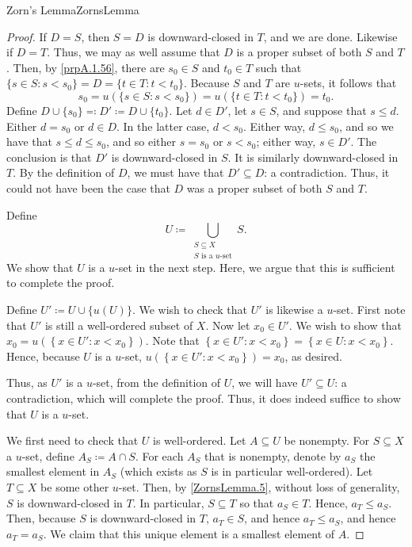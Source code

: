 \begin{thm}{Zorn's Lemma}{ZornsLemma}
\begin{proof}
If $D=S$, then $S=D$ is downward-closed in $T$, and we are done.  Likewise if $D=T$.  Thus, we may as well assume that $D$ is a proper subset of both $S$ and $T$.  Then, by \cref{prpA.1.56}, there are $s_0\in S$ and $t_0\in T$ such that $\{ s\in S:s<s_0\} =D=\{ t\in T:t<t_0\}$.  Because $S$ and $T$ are $u$-sets, it follows that
\begin{equation}
s_0=u\left( \{ s\in S:s<s_0\} \right) =u\left( \{ t\in T:t<t_0\} \right) =t_0.
\end{equation}
Define $D\cup \{ s_0\} \eqqcolon D'\coloneqq D\cup \{ t_0\}$.
Let $d\in D'$, let $s\in S$, and suppose that $s\leq d$.  Either $d=s_0$ or $d\in D$.  In the latter case, $d<s_0$.  Either way, $d\leq s_0$, and so we have that $s\leq d\leq s_0$, and so either $s=s_0$ or $s<s_0$; either way, $s\in D'$.  The conclusion is that $D'$ is downward-closed in $S$.  It is similarly downward-closed in $T$.  By the definition of $D$, we must have that $D'\subseteq D$:  a contradiction.  Thus, it could not have been the case that $D$ was a proper subset of both $S$ and $T$.

Define
\begin{equation}
U\coloneqq \bigcup _{\substack{S\subseteq X \\ S\text{ is a }u\text{-set}}}S.
\end{equation}
We show that $U$ is a $u$-set in the next step.  Here, we argue that this is sufficient to complete the proof.

Define $U'\coloneqq U\cup \{ u(U)\}$.  We wish to check that $U'$ is likewise a $u$-set.  First note that $U'$ is still a well-ordered subset of $X$.  Now let $x_0\in U'$.  We wish to show that $x_0=u\left( \left\{ x\in U':x<x_0\right\} \right)$.  Note that $\left\{ x\in U':x<x_0\right\} =\left\{ x\in U:x<x_0\right\}$.  Hence, because $U$ is a $u$-set, $u\left( \left\{ x\in U':x<x_0\right\} \right) =x_0$, as desired.

Thus, as $U'$ is a $u$-set, from the definition of $U$, we will have $U'\subseteq U$:  a contradiction, which will complete the proof.  Thus, it does indeed suffice to show that $U$ is a $u$-set.

We first need to check that $U$ is well-ordered.  Let $A\subseteq U$ be nonempty.  For $S\subseteq X$ a $u$-set, define $A_S\coloneqq A\cap S$.  For each $A_S$ that is nonempty, denote by $a_S$ the smallest element in $A_S$ (which exists as $S$ is in particular well-ordered).  Let $T\subseteq X$ be some other $u$-set.  Then, by \cref{ZornsLemma.5}, without loss of generality, $S$ is downward-closed in $T$.  In particular, $S\subseteq T$ so that $a_S\in T$.  Hence, $a_T\leq a_S$.  Then, because $S$ is downward-closed in $T$, $a_T\in S$, and hence $a_T\leq a_S$, and hence $a_T=a_S$.  We claim that this unique element is a smallest element of $A$.


\end{proof}
\end{thm}
